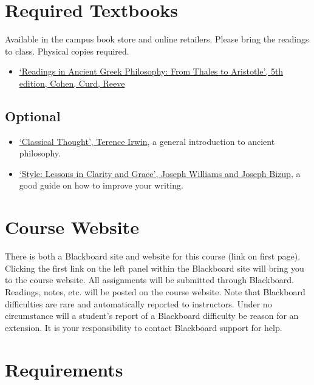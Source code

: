 \documentclass[article,oneside]{memoir}
\begin{document}
\section{Required Textbooks}

Available in the campus book store and online retailers. Please bring the readings to class. Physical copies required.
\begin{itemize}
\item \href{https://www.amazon.com/Readings-Ancient-Greek-Philosophy-Aristotle/dp/1624665322/ref=dp_ob_title_bk}{`Readings in Ancient Greek Philosophy: From Thales to Aristotle', 5th edition, Cohen, Curd, Reeve}


\end{itemize}
\subsection{Optional}

\begin{itemize}
\item \href{https://www.amazon.com/Classical-Thought-History-Western-Philosophy/dp/0192891774/ref=sr_1_1?s=books&ie=UTF8&qid=1515009994&sr=1-1&keywords=classical+thought}{`Classical Thought', Terence Irwin}, a general introduction to ancient philosophy.

\item \href{http://www.amazon.com/Style-Lessons-Clarity-Grace-11th/dp/0321898680/ref=sr_1_1?ie=UTF8&qid=1452356026&sr=8-1&keywords=lessons+in+clarity+and+grace}{`Style: Lessons in Clarity and Grace', Joseph Williams and Joseph Bizup}, a good guide on how to improve your writing. 
\end{itemize}
\section{Course Website}
There is both a Blackboard site and website for this course (link on first page). Clicking the first link on the left panel within the Blackboard site will bring you to the course website. All assignments will be submitted through Blackboard. Readings, notes, etc. will be posted on the course website. Note that Blackboard difficulties are rare and automatically reported to instructors. Under no circumstance will a student's report of a Blackboard difficulty be reason for an extension. It is your responsibility to contact Blackboard support for help.


\section{Requirements}
\end{document}
